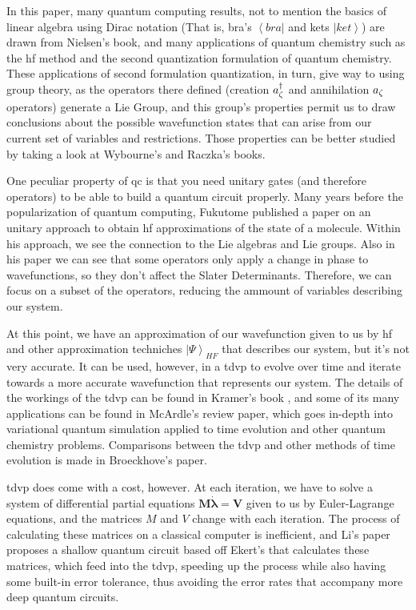 \documentclass{aux/ttuthes2007}
\newcommand{\bra}[1]{\ensuremath{\left\langle#1\right\vert}}
\newcommand{\ket}[1]{\ensuremath{\left|#1\right\rangle}}
\newcommand{\anig}[1]{a_{\go{#1}}}
\newcommand{\creg}[1]{a^\dagger_{\go{#1}}}
\newcommand{\go}[1]{
		\IfEqCase{#1}{
			{0}{\zeta}
			{1}{\eta}
			{2}{\iota}
			{3}{\kappa}
		}[\PackageError{unocorb}{Undefined option to go: #1}{}]
}
\begin{document}
	In this paper, many quantum computing results, not to mention the basics of linear algebra using Dirac notation (That is, bra's $\bra {bra}$ and kets $\ket{ket}$) are drawn from Nielsen's book\cite{nielsen}, and many applications of quantum chemistry such as the \gls{hf} method and the second quantization formulation of quantum chemistry.
	These applications of second formulation quantization, in turn, give way to using group theory, as the operators there defined (creation $\creg 0$ and annihilation $\anig 0$ operators) generate a Lie Group, and this group's properties permit us to draw conclusions about the possible wavefunction states that can arise from our current set of variables and restrictions. Those properties can be better studied by taking a look at Wybourne's  and Raczka's  books.
	
	One peculiar property of \gls{qc} is that you need unitary gates (and therefore operators) to be able to build a quantum circuit properly. Many years before the popularization of quantum computing, Fukutome  published a paper on an unitary approach to obtain \gls{hf} approximations of the state of a molecule. Within his approach, we see the connection to the Lie algebras and Lie groups. Also in his paper we can see that some operators only apply a change in phase to wavefunctions, so they don't affect the Slater Determinants. Therefore, we can focus on a subset of the operators, reducing the ammount of variables describing our system.

	At this point, we have an approximation of our wavefunction given to us by \gls{hf} and other approximation techniches $\ket\Psi_{HF}$ that describes our system, but it's not very accurate. It can be used, however, in a \gls{tdvp} to evolve over time and iterate towards a more accurate wavefunction that represents our system. The details of the workings of the \gls{tdvp} can be found in Kramer's book , and some of its many applications can be found in McArdle's  review paper, which goes in-depth into variational quantum simulation applied to time evolution and other quantum chemistry problems. Comparisons between the \gls{tdvp} and other methods of time evolution is made in Broeckhove's  paper.

	\gls{tdvp} does come with a cost, however. At each iteration, we have to solve a system of differential partial equations $\bm M \dot {\bm \lambda} = \bm V$ given to us by Euler-Lagrange equations, and the matrices $M$ and $V$ change with each iteration. The process of calculating these matrices on a classical computer is inefficient, and Li's paper  proposes a shallow quantum circuit based off Ekert's  that calculates these matrices, which feed into the \gls{tdvp}, speeding up the process while also having some built-in error tolerance, thus avoiding the error rates that accompany more deep quantum circuits.
\end{document}
